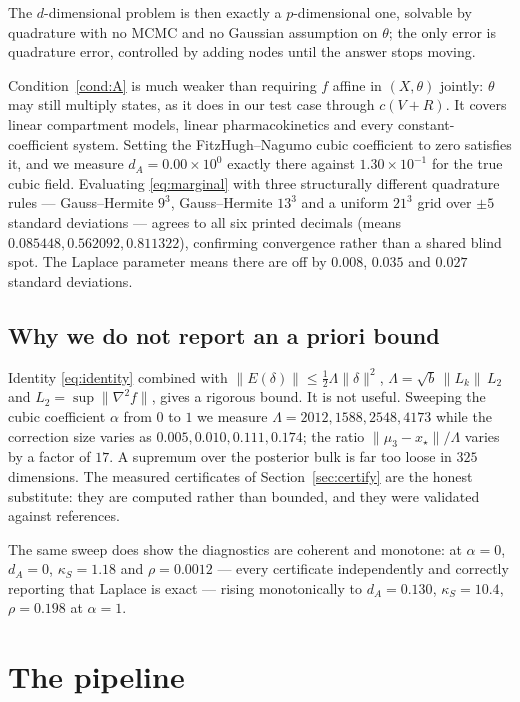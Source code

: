 \documentclass[11pt]{article}
\newcommand{\xmap}{x_{\star}}
\theoremstyle{plain}
\theoremstyle{definition}
\theoremstyle{remark}
\begin{document}
The $d$-dimensional problem is then exactly a $p$-dimensional one, solvable by quadrature with no
MCMC and no Gaussian assumption on $\theta$; the only error is quadrature error, controlled by
adding nodes until the answer stops moving.

Condition~\ref{cond:A} is much weaker than requiring $f$ affine in $(X,\theta)$ jointly: $\theta$
may still multiply states, as it does in our test case through $c(V+R)$. It covers linear
compartment models, linear pharmacokinetics and every constant-coefficient system. Setting the
FitzHugh--Nagumo cubic coefficient to zero satisfies it, and we measure $d_A = 0.00\times10^{0}$
exactly there against $1.30\times10^{-1}$ for the true cubic field. Evaluating \eqref{eq:marginal}
with three structurally different quadrature rules --- Gauss--Hermite $9^3$, Gauss--Hermite $13^3$
and a uniform $21^3$ grid over $\pm5$ standard deviations --- agrees to all six printed decimals
(means $0.085448, 0.562092, 0.811322$), confirming convergence rather than a shared blind spot. The
Laplace parameter means there are off by $0.008$, $0.035$ and $0.027$ standard deviations.

\subsection{Why we do not report an a priori bound}

Identity \eqref{eq:identity} combined with $\|E(\delta)\| \le \tfrac12\Lambda\|\delta\|^2$,
$\Lambda = \sqrt{b}\,\|L_k\|\,L_2$ and $L_2 = \sup\|\nabla^2 f\|$, gives a rigorous bound. It is not
useful. Sweeping the cubic coefficient $\alpha$ from $0$ to $1$ we measure $\Lambda = 2012, 1588,
2548, 4173$ while the correction size varies as $0.005, 0.010, 0.111, 0.174$; the ratio
$\|\mu_3-\xmap\|/\Lambda$ varies by a factor of $17$. A supremum over the posterior bulk is far too
loose in $325$ dimensions. The measured certificates of Section~\ref{sec:certify} are the honest
substitute: they are computed rather than bounded, and they were validated against references.

The same sweep does show the diagnostics are coherent and monotone: at $\alpha = 0$, $d_A = 0$,
$\kappa_S = 1.18$ and $\rho = 0.0012$ --- every certificate independently and correctly reporting
that Laplace is exact --- rising monotonically to $d_A = 0.130$, $\kappa_S = 10.4$, $\rho = 0.198$ at
$\alpha = 1$.

\section{The pipeline}
\end{document}
